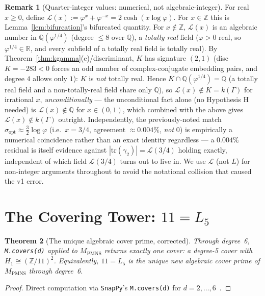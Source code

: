 \documentclass[12pt]{article}
\newtheorem{theorem}{Theorem}
\theoremstyle{definition}
\newtheorem{remark}[theorem]{Remark}
\newcommand{\Z}{\mathbb{Z}}
\newcommand{\Q}{\mathbb{Q}}
\newcommand{\R}{\mathbb{R}}
\newcommand{\ph}{\varphi}
\newcommand{\Lcal}{\mathcal{L}}
\newcommand{\logph}{\log\ph}
\newcommand{\tr}{\mathrm{tr}}
\begin{document}
\begin{remark}[Quarter-integer values: numerical, not algebraic-integer]
\label{rem:quarter}
For real $x\geq0$, define $\Lcal(x):=\ph^x+\ph^{-x}=2\cosh(x\logph)$.
For $x\in\Z$ this is Lemma~\ref{lem:bifurcation}'s bifurcated
quantity. For $x\notin\Z$, $\Lcal(x)$ is an algebraic number in
$\Q(\ph^{1/4})$ (degree $\leq8$ over $\Q$), a \emph{totally real}
field ($\ph>0$ real, so $\ph^{1/4}\in\R$, and every subfield of a
totally real field is totally real). By
Theorem~\ref{thm:kgamma}(c)/discriminant, $K$ has signature $(2,1)$
(disc $K=-283<0$ forces an odd number of complex-conjugate embedding
pairs, and degree $4$ allows only $1$): $K$ is \emph{not} totally
real. Hence $K\cap\Q(\ph^{1/4})=\Q$ (a totally real field and a
non-totally-real field share only $\Q$), so
$\Lcal(x)\notin K=k(\Gamma)$ for irrational $x$, \emph{unconditionally}
--- the unconditional fact alone (no Hypothesis H needed) is
$\Lcal(x)\notin\Q$ for $x\in(0,1)$, which combined with the above gives
$\Lcal(x)\notin k(\Gamma)$ outright. Independently, the
previously-noted match
$\sigma_{\mathrm{opt}}\approx\tfrac32\logph$ (i.e.\ $x=3/4$, agreement
$\approx0.004\%$, \emph{not} $0$) is empirically a numerical
coincidence rather than an exact identity regardless --- a $0.004\%$
residual is itself evidence against
$|\tr(\gamma_2)|=\Lcal(3/4)$ holding exactly, independent of which
field $\Lcal(3/4)$ turns out to live in. We use $\Lcal$ (not $L$) for
non-integer arguments throughout to avoid the notational collision
that caused the v1 error.
\end{remark}

\section{The Covering Tower: $11=L_5$}
\label{sec:cover}

\begin{theorem}[The unique algebraic cover prime, corrected]
\label{thm:cover}
Through degree~6, \texttt{M.covers(d)} applied to $M_{\mathrm{PMNS}}$
returns exactly one cover: a degree-5 cover with
$H_1\cong(\Z/11)^2$. Equivalently, $11=L_5$ is the unique new
algebraic cover prime of $M_{\mathrm{PMNS}}$ through degree~6.
\end{theorem}

\begin{proof}
Direct computation via \texttt{SnapPy}'s \texttt{M.covers(d)} for
$d=2,\ldots,6$~\cite{snappy}.
\end{proof}
\end{document}
